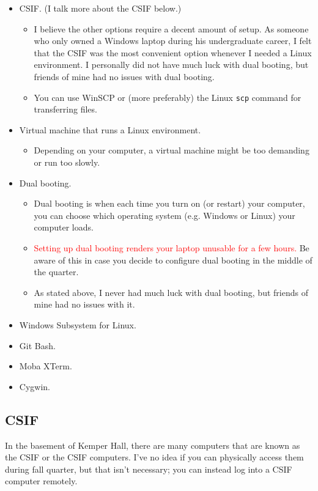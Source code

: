 \documentclass{article}
\begin{document}
\begin{itemize}[itemsep=0mm, parsep=0pt]
\item CSIF. (I talk more about the CSIF below.)
    \begin{itemize}[itemsep=0mm, parsep=0pt]
    \item I believe the other options require a decent amount of setup. As someone who only owned a Windows laptop during his undergraduate career, I felt that the CSIF was the most convenient option whenever I needed a Linux environment. I personally did not have much luck with dual booting, but friends of mine had no issues with dual booting.
    \item You can use WinSCP or (more preferably) the Linux \lstinline{scp} command for transferring files.
    \end{itemize}
\item Virtual machine that runs a Linux environment.
    \begin{itemize}[itemsep=0mm, parsep=0pt]
    \item Depending on your computer, a virtual machine might be too demanding or run too slowly.
    \end{itemize}
\item Dual booting.
    \begin{itemize}[itemsep=0mm, parsep=0pt]
    \item Dual booting is when each time you turn on (or restart) your computer, you can choose which operating system (e.g. Windows or Linux) your computer loads.
    \item \textcolor{red}{Setting up dual booting renders your laptop unusable for a few hours.} Be aware of this in case you decide to configure dual booting in the middle of the quarter.
    \item As stated above, I never had much luck with dual booting, but friends of mine had no issues with it.
    \end{itemize}
\item Windows Subsystem for Linux.
\item Git Bash.
\item Moba XTerm.
\item Cygwin.
\end{itemize}

\subsection{CSIF}

In the basement of Kemper Hall, there are many computers that are known as the CSIF or the CSIF computers. I've no idea if you can physically access them during fall quarter, but that isn't necessary; you can instead log into a CSIF computer remotely.
\end{document}
